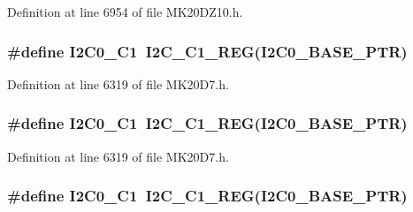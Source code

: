 Definition at line 6954 of file M\+K20\+D\+Z10.\+h.

\subsubsection[{\texorpdfstring{I2\+C0\+\_\+\+C1}{I2C0_C1}}]{\setlength{\rightskip}{0pt plus 5cm}\#define I2\+C0\+\_\+\+C1~{\bf I2\+C\+\_\+\+C1\+\_\+\+R\+EG}({\bf I2\+C0\+\_\+\+B\+A\+S\+E\+\_\+\+P\+TR})}\hypertarget{group___i2_c___register___accessor___macros_gad710afb8dd19706b83bc65c3f460e81d}{}\label{group___i2_c___register___accessor___macros_gad710afb8dd19706b83bc65c3f460e81d}


Definition at line 6319 of file M\+K20\+D7.\+h.

\subsubsection[{\texorpdfstring{I2\+C0\+\_\+\+C1}{I2C0_C1}}]{\setlength{\rightskip}{0pt plus 5cm}\#define I2\+C0\+\_\+\+C1~{\bf I2\+C\+\_\+\+C1\+\_\+\+R\+EG}({\bf I2\+C0\+\_\+\+B\+A\+S\+E\+\_\+\+P\+TR})}\hypertarget{group___i2_c___register___accessor___macros_gad710afb8dd19706b83bc65c3f460e81d}{}\label{group___i2_c___register___accessor___macros_gad710afb8dd19706b83bc65c3f460e81d}


Definition at line 6319 of file M\+K20\+D7.\+h.

\subsubsection[{\texorpdfstring{I2\+C0\+\_\+\+C1}{I2C0_C1}}]{\setlength{\rightskip}{0pt plus 5cm}\#define I2\+C0\+\_\+\+C1~{\bf I2\+C\+\_\+\+C1\+\_\+\+R\+EG}({\bf I2\+C0\+\_\+\+B\+A\+S\+E\+\_\+\+P\+TR})}\hypertarget{group___i2_c___register___accessor___macros_gad710afb8dd19706b83bc65c3f460e81d}{}\label{group___i2_c___register___accessor___macros_gad710afb8dd19706b83bc65c3f460e81d}


